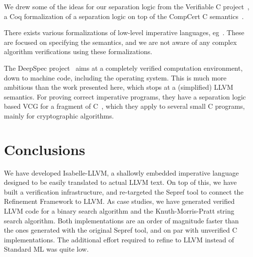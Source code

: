 \documentclass[a4paper,USenglish,cleveref, autoref]{lipics-v2019}
\begin{document}
We drew some of the ideas for our separation logic from the Verifiable C project~\cite{App14}, 
a Coq formalization of a separation logic on top of the CompCert C semantics~\cite{BL09}.

There exists various formalizations of low-level imperative languages, eg~\cite{Loch12,Watt18}. 
These are focused on specifying the semantics, and we are not aware of any complex 
algorithm verifications using these formalizations.

The DeepSpec project~\cite{deepspec} aims at a completely verified computation environment, 
down to machine code, including the operating system. 
This is much more ambitious than the work presented here, which stops at a (simplified) LLVM semantics.
For proving correct imperative programs, they have a separation logic based VCG for a fragment of C~\cite{App14,CBGD18},
which they apply to several small C programs, mainly for cryptographic algorithms. 


\section{Conclusions}
We have developed Isabelle-LLVM, a shallowly embedded imperative language designed to be easily translated to actual LLVM text. 
On top of this, we have built a verification 
infrastructure, and re-targeted the Sepref tool to connect the Refinement Framework to LLVM. 
As case studies, we have generated verified LLVM code for a binary search algorithm and the Knuth-Morris-Pratt string search algorithm.
Both implementations are an order of magnitude faster than the ones generated with the original Sepref tool, and on par with unverified C implementations.
The additional effort required to refine to LLVM instead of Standard ML was quite low.






% 
\end{document}
